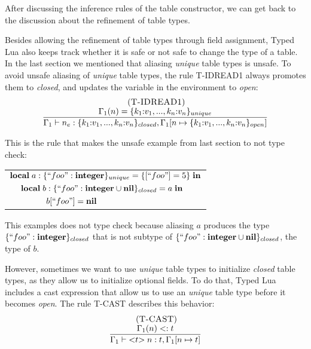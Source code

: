 After discussing the inference rules of the table constructor,
we can get back to the discussion about the refinement of table types.

Besides allowing the refinement of table types through field assignment,
Typed Lua also keeps track whether it is safe or not safe to change the
type of a table.
In the last section we mentioned that aliasing \emph{unique} table
types is unsafe.
To avoid unsafe aliasing of \emph{unique} table types, the rule \textsc{T-IDREAD1}
always promotes them to \emph{closed}, and updates the variable in the
environment to \emph{open}:
\[
\begin{array}{c}
\; (\textsc{T-IDREAD1})\\
\dfrac{\Gamma_{1}(n) = \{k_{1}{:}v_{1}, ..., k_{n}{:}v_{n}\}_{unique}}
      {\Gamma_{1} \vdash n_{e}:\{k_{1}{:}v_{1}, ..., k_{n}{:}v_{n}\}_{closed}, \Gamma_{1}[n \mapsto \{k_{1}{:}v_{1}, ..., k_{n}{:}v_{n}\}_{open}]}
\end{array}
\]

This is the rule that makes the unsafe example from last section to
not type check:
\begin{center}
\begin{tabular}{lll}
\multicolumn{3}{l}{$\mathbf{local} \; a:\{``foo":\mathbf{integer}\}_{unique} = \{ [``foo"] = 5 \} \; \mathbf{in}$}\\
& \multicolumn{2}{l}{$\mathbf{local} \; b:\{``foo":\mathbf{integer} \cup \mathbf{nil} \}_{closed} = a \; \mathbf{in}$}\\
& & \multicolumn{1}{l}{$b[``foo"] = \mathbf{nil}$}
\end{tabular}
\end{center}

This examples does not type check because aliasing $a$ produces the
type $\{``foo":\mathbf{integer}\}_{closed}$ that is not subtype of
$\{``foo":\mathbf{integer} \cup \mathbf{nil}\}_{closed}$, the type of $b$.

However, sometimes we want to use \emph{unique} table types to initialize
\emph{closed} table types, as they allow us to initialize optional fields.
To do that, Typed Lua includes a cast expression that allow us
to use an \emph{unique} table type before it becomes \emph{open}.
The rule \textsc{T-CAST} describes this behavior:
\[
\begin{array}{c}
\; (\textsc{T-CAST})\\
\dfrac{\Gamma_{1}(n) <: t}
      {\Gamma_{1} \vdash {<}t{>} \; n:t, \Gamma_{1}[n \mapsto t]}
\end{array}
\]

